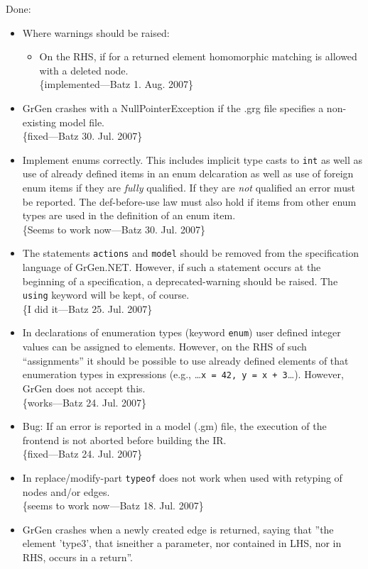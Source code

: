 \documentclass[12pt,a4paper]{article}
\begin{document}
\noindent
Done:
\begin{itemize}
	\item Where warnings should be raised:
		\begin{itemize}
			\item On the RHS, if for a returned element homomorphic matching is allowed with a deleted node.\\
				\{implemented---Batz 1. Aug. 2007\}
		\end{itemize}
    \item GrGen crashes with a NullPointerException if the .grg file specifies a non-existing model file.\\
		\{fixed---Batz 30. Jul. 2007\}
	\item Implement enums correctly. This includes implicit type casts to {\tt int} as well as use of already defined items in an enum delcaration as well as use of foreign enum items if they are \emph{fully} qualified.
		If they are \emph{not} qualified an error must be reported.
		The def-before-use law must also hold if items from other enum types are used in the definition of an enum item.\\
		\{Seems to work now---Batz 30. Jul. 2007\}
	\item The statements {\tt actions} and {\tt model} should be removed from the specification language of GrGen.NET.
		However, if such a statement occurs at the beginning of a specification, a deprecated-warning should be raised.
		The {\tt using} keyword will be kept, of course.\\
		\{I did it---Batz 25. Jul. 2007\}
	\item In declarations of enumeration types (keyword {\tt enum}) user defined integer values can be assigned to elements.
	  However, on the RHS of such "`assignments"' it should be possible to use already defined elements of that enumeration types in expressions (e.g., \dots{}{\tt{}x = 42, y = x + 3}\dots). However, GrGen does not accept this.\\
		\{works---Batz 24. Jul. 2007\}
	\item Bug: If an error is reported in a model (.gm) file, the execution of the frontend is not aborted before building the IR.\\
		\{fixed---Batz 24. Jul. 2007\}
	\item In replace/modify-part {\tt typeof} does not work when used with retyping of nodes and/or edges.\\
		\{seems to work now---Batz 18. Jul. 2007\}
    \item GrGen crashes when a newly created edge is returned, saying that ''the element 'type3', that isneither a parameter, nor contained in LHS, nor in RHS, occurs in a return''.

\end{itemize}
\end{document}
